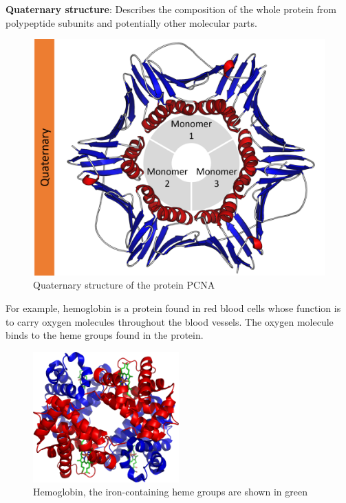 \textbf{Quaternary structure}: Describes the composition of the whole protein from polypeptide subunits and potentially other molecular parts.

\begin{figure}[H]
    \centering
    \includegraphics[width=\textwidth]{figures/bioinformatics/protein_structure_quaternary.png}
    \caption{Quaternary structure of the protein PCNA\cite{protein_structure}}
\end{figure}

For example, hemoglobin is a protein found in red blood cells whose function is to carry oxygen molecules throughout the blood vessels. The oxygen molecule binds to the heme groups found in the protein.

\begin{figure}[H]
    \centering
    \includegraphics[width=0.5\textwidth]{figures/bioinformatics/hemoglobin.png}
    \caption{Hemoglobin, the iron-containing heme groups are shown in green\cite{wheeler_1gzx_nodate}}
\end{figure}

